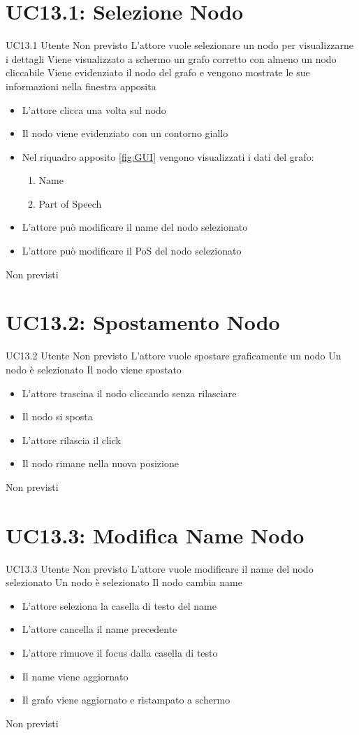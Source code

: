 \documentclass[../AnalisideiRequisiti.tex]{subfiles}
\begin{document}
\section{UC13.1: Selezione Nodo}
\UserCase
{UC13.1}
{Utente}
{Non previsto}
{L'attore vuole selezionare un nodo per visualizzarne i dettagli}
{Viene visualizzato a schermo un grafo corretto con almeno un nodo cliccabile }
{Viene evidenziato il nodo del grafo e vengono mostrate le sue informazioni nella finestra apposita}
{
	\begin{itemize}
		\item{} L'attore clicca una volta sul nodo
		\item{} Il nodo viene evidenziato con un contorno giallo
		\item{} Nel riquadro apposito \ref{fig:GUI} vengono visualizzati i dati del grafo:
		\begin{enumerate}
			\item{} Name
			\item{} Part of Speech
		\end{enumerate}
		\item{} L'attore può modificare il name del nodo selezionato 
		\item{} L'attore può modificare il PoS del nodo selezionato  
	\end{itemize}
}
{Non previsti}

\section{UC13.2: Spostamento Nodo}
\UserCase
{UC13.2}
{Utente}
{Non previsto}
{L'attore vuole spostare graficamente un nodo}
{Un nodo è selezionato }
{Il nodo viene spostato}
{
	\begin{itemize}
		\item{} L'attore trascina il nodo cliccando senza rilasciare
		\item{} Il nodo si sposta
		\item{} L'attore rilascia il click
		\item{} Il nodo rimane nella nuova posizione
	\end{itemize}
}
{Non previsti}

\section{UC13.3: Modifica Name Nodo}
\UserCase
{UC13.3}
{Utente}
{Non previsto}
{L'attore vuole modificare il name del nodo selezionato}
{Un nodo è selezionato }
{Il nodo cambia name}
{
	\begin{itemize}
		\item{} L'attore seleziona la casella di testo del name
		\item{} L'attore cancella il name precedente
		\item{} L'attore rimuove il focus dalla casella di testo
		\item{} Il name viene aggiornato
		\item{} Il grafo viene aggiornato e ristampato a schermo 
	\end{itemize}
}
{Non previsti}
\end{document}
